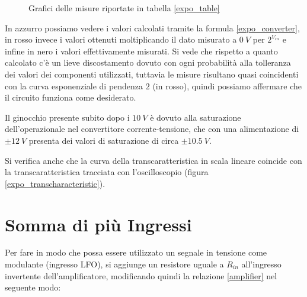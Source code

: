 \begin{figure}[H]
\begin{subfigure}{.5\textwidth}
    \end{subfigure}

    \caption{Grafici delle misure riportate in tabella \ref{expo_table}}
    \label{expo_graphs}
\end{figure}

In azzurro possiamo vedere i valori calcolati tramite la formula \ref{expo_converter},
in rosso invece i valori ottenuti moltiplicando il dato misurato a $0\ V$ per $2^{V_{in}}$
e infine in nero i valori effettivamente misurati. Si vede che rispetto a quanto calcolato
c'è un lieve discostamento dovuto con ogni probabilità alla tolleranza dei valori dei
componenti utilizzati, tuttavia le misure risultano quasi coincidenti con la curva esponenziale
di pendenza $2$ (in rosso), quindi possiamo affermare che il circuito funziona come desiderato.

Il ginocchio presente subito dopo i $10\ V$ è dovuto alla saturazione dell'operazionale
nel convertitore corrente-tensione, che con una alimentazione di $\pm12\ V$ presenta dei
valori di saturazione di circa $\pm10.5\ V$.

Si verifica anche che la curva della transcaratteristica in scala lineare coincide con la
transcaratteristica tracciata con l'oscilloscopio (figura \ref{expo_transcharacteristic}).


\section{Somma di più Ingressi}


Per fare in modo che possa essere utilizzato un segnale in tensione come modulante (ingresso
LFO), si aggiunge un resistore uguale a $R_{in}$ all'ingresso invertente dell'amplificatore,
modificando quindi la relazione \ref{amplifier} nel seguente modo:

